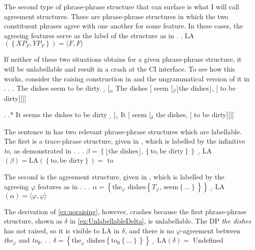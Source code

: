 The second type of phrase-phrase structure that can surface is what I will call agreement structures.
These are phrase-phrase structures in which the two constituent phrases agree with one another for some feature.
In these cases, the agreeing features serve as the label of the structure as in \Next.
\ex. LA$(\left\{ XP_F, YP_F \right\}) = \langle F,F\rangle$

If neither of these two situations obtains for a given phrase-phrase structure, it will be unlabellable and result in a crash at the CI interface.
To see how this works, consider the raising construction in \Next and the ungrammatical version of it in \NNext.
\ex.\label{ex:raising}
\a. The dishes seem to be dirty.
\b. [$_\alpha$ The dishes [ seem [$_\beta \lfloor\text{the dishes}\rfloor$, [ to be dirty]]]]

\ex.\label{ex:noraising}
\a.* It seems the dishes to be dirty
\b. [$_\gamma$ It [ seem [$_\delta$ the dishes, [ to be dirty]]]]

The sentence in \LLast has two relevant phrase-phrase structures which are labellable.
The first is a trace-phrase structure, given in \Next[a], which is labelled by the infinitive \textit{to}, as demonstrated in \Next[b].
\ex.
\a.  $\beta = \left\{ \lfloor\text{the dishes}\rfloor, \left\{ \text{to}, \text{be dirty} \right\} \right\}$
\b. LA$(\beta) = \text{LA}(\left\{ \text{to}, \text{be dirty} \right\}) =$ to

The second is the agreement structure, given in \Next[b], which is labelled by the agreeing $\varphi$ features as in \Next[b].
\ex.
\a. $\alpha = \left\{ \text{the}_\varphi \text{ dishes} \left\{ T_\varphi \text{, seem} \left\{ \ldots \right\} \right\} \right\}$
\b. LA$(\alpha) = \langle\varphi, \varphi\rangle$

The derivation of \ref{ex:noraising}, however, crashes because the first phrase-phrase structure, shown as $\delta$ in \cref{ex:UnlabellableDelta}, is unlabellable.
The DP \textit{the dishes} has not raised, so it is visible to LA in $\delta$, and there is no $\varphi$-agreement between \textit{the}$_\varphi$ and \textit{to}$_\emptyset$.
\ex.\label{ex:UnlabellableDelta}
\a. $\delta = \left\{ \text{the}_\varphi \text{ dishes} \left\{ \text{to}_\emptyset \left\{ \ldots \right\}\right\} \right\}$
\b. LA$(\delta) = $ Undefined



